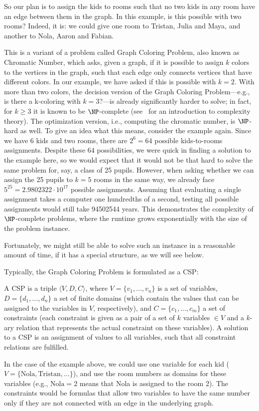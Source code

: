 \documentclass[thesis.tex]{subfiles}
\begin{document}
So our plan is to assign the kids to rooms such that no two kids in any room have an edge between them in the graph. In this example, is this possible with two rooms? Indeed, it is: we could give one room to Tristan, Julia and Maya, and another to Nola, Aaron and Fabian.

This is a variant of a problem called Graph Coloring Problem, also known as Chromatic Number, which asks, given a graph, if it is possible to assign $k$ colors to the vertices in the graph, such that each edge only connects vertices that have different colors. In our example, we have asked if this is possible with $k=2$. With more than two colors, the decision version of the Graph Coloring Problem---e.g., is there a k-coloring with $k=3$?---is already significantly harder to solve; in fact, for $k \ge 3$ it is known to be $\NP$-complete (see~\parencite{DBLP:books/daglib/0018514} for an introduction to complexity theory). The optimization version, i.e., computing the chromatic number, is $\NP$-hard as well. To give an idea what this means, consider the example again. Since we have 6 kids and two rooms, there are $2^6 = 64$ possible kids-to-rooms assignments. Despite these $64$ possibilities, we were quick in finding a solution to the example here, so we would expect that it would not be that hard to solve the same problem for, say, a class of 25 pupils. However, when asking whether we can assign the 25 pupils to $k=5$ rooms in the same way, we already face $5^{25} = 2.9802322\cdot 10^{17}$ possible assignments. Assuming that evaluating a single assignment takes a computer one hundredths of a second, testing all possible assignments would still take 94502544 years. This demonstrates the complexity of $\NP$-complete problems, where the runtime grows exponentially with the size of the problem instance.

Fortunately, we might still be able to solve such an instance in a reasonable amount of time, if it has a special structure, as we will see below.

\smallbreak
Typically, the Graph Coloring Problem is formulated as a \gls{CSP}:
\begin{Definition}
   A \gls{CSP} is a triple $\langle V, D, C \rangle$, where $V = \{v_1, \ldots, v_n\}$ is a set of variables, $D = \{d_1, \ldots, d_n\}$ a set of finite domains (which contain the values that can be assigned to the variables in $V$, respectively), and $C = \{c_1, \ldots, c_m\}$ a set of constraints (each constraint is given as a pair of a set of $k$ variables $\in V$ and a $k$-ary relation that represents the actual constraint on these variables). A solution to a \gls{CSP} is an assignment of values to all variables, such that all constraint relations are fulfilled.
\end{Definition}
In the case of the example above, we could use one variable for each kid ($V = \{\mathrm{Nola}, \mathrm{Tristan}, \ldots\}$), and use the room numbers as domains for these variables (e.g., $\mathrm{Nola} = 2$ means that Nola is assigned to the room 2). The constraints would be formulas that allow two variables to have the same number only if they are not connected with an edge in the underlying graph.
\end{document}
